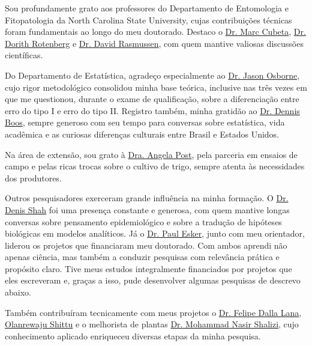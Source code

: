\documentclass[12pt,a4paper,oneside]{book}
\begin{document}
Sou profundamente grato aos professores do Departamento de Entomologia e Fitopatologia da
North Carolina State University, cujas contribuições técnicas foram fundamentais ao longo do meu doutorado. Destaco o
\href{https://cals.ncsu.edu/entomology-and-plant-pathology/people/macubeta/}{Dr. Marc Cubeta},
\href{https://cals.ncsu.edu/entomology-and-plant-pathology/people/drotenb/}{Dr. Dorith Rotenberg} e
\href{https://phylodynamics.wordpress.ncsu.edu/people/david-rasmussen/}{Dr. David Rasmussen},
com quem mantive valiosas discussões científicas.

Do Departamento de Estatística, agradeço especialmente ao
\href{https://statistics.sciences.ncsu.edu/people/jaosborn/}{Dr. Jason Osborne}, cujo rigor
metodológico consolidou minha base teórica, inclusive nas três vezes em que me questionou, durante o 
exame de qualificação, sobre a diferenciação entre erro do tipo I e erro do tipo II. Registro também,
minha gratidão ao \href{https://statistics.sciences.ncsu.edu/people/boos/}{Dr. Dennis Boos}, sempre 
generoso com seu tempo para conversas sobre estatística, vida acadêmica e as curiosas diferenças 
culturais entre Brasil e Estados Unidos.

Na área de extensão, sou grato à \href{https://www.ces.ncsu.edu/profile/angela-post/}{Dra. Angela Post},
pela parceria em ensaios de campo e pelas ricas trocas sobre o cultivo de trigo, sempre atenta às necessidades dos produtores.

Outros pesquisadores exerceram grande influência na minha formação. O \href{https://www.linkedin.com/in/denis-shah-28360120}{Dr. Denis Shah}
foi uma presença constante e generosa, com quem mantive longas conversas sobre pensamento
epidemiológico e sobre a tradução de hipóteses biológicas em modelos analíticos. Já o
\href{https://plantpath.psu.edu/directory/pde6}{Dr. Paul Esker},
junto com meu orientador, liderou os projetos que financiaram meu doutorado. Com ambos aprendi não 
apenas ciência, mas também a conduzir pesquisas com relevância prática e propósito claro. Tive meus estudos 
integralmente financiados por projetos que eles escreveram e, graças a isso, pude desenvolver algumas pesquisas de descrevo abaixo.

Também contribuíram tecnicamente com meus projetos o
\href{https://www.lsu.edu/agriculture/ppcp/people/profile/felipe-dalla-lana.php}{Dr. Felipe Dalla Lana},
\href{https://www.linkedin.com/in/olanrewaju-shittu-m/}{Olanrewaju Shittu}
e o melhorista de plantas
\href{https://scholar.google.com/citations?user=kHw-7L4AAAAJ&hl=en}{Dr. Mohammad Nasir Shalizi},
cujo conhecimento aplicado enriqueceu diversas etapas da minha pesquisa.
  
\end{document}
